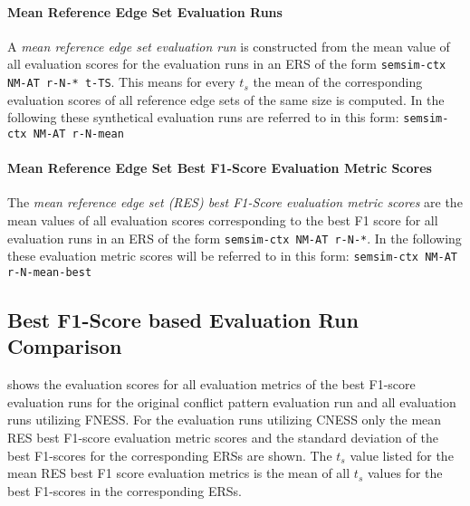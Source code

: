 \documentclass[11pt]{scrreprt}
\begin{document}
\paragraph{Mean Reference Edge Set Evaluation Runs}
A \textit{mean reference edge set evaluation run} is constructed from the mean value of all evaluation scores for the evaluation runs in an ERS of the form \texttt{semsim-ctx NM-AT r-N-* t-TS}. This means for every \(t_s\) the mean of the corresponding evaluation scores of all reference edge sets of the same size is computed. In the following these synthetical evaluation runs are referred to in this form: \texttt{semsim-ctx NM-AT r-N-mean}

\paragraph{Mean Reference Edge Set Best F1-Score Evaluation Metric Scores}
The \textit{mean reference edge set (RES) best F1-Score evaluation metric scores} are the mean values of all evaluation scores corresponding to the best F1 score for all evaluation runs in an ERS of the form \texttt{semsim-ctx NM-AT r-N-*}. In the following these evaluation metric scores will be referred to in this form: \texttt{semsim-ctx NM-AT r-N-mean-best}



\subsection{Best F1-Score based Evaluation Run Comparison}
\label{sec:best-f1-score-eval-run-comparison}
 shows the evaluation scores for all evaluation metrics of the best F1-score evaluation runs for the original conflict pattern evaluation run and all evaluation runs utilizing FNESS. For the evaluation runs utilizing CNESS only the mean RES best F1-score evaluation metric scores and the standard deviation of the best F1-scores for the corresponding ERSs are shown. The \(t_s\) value listed for the mean RES best F1 score evaluation metrics is the mean of all \(t_s\) values for the best F1-scores in the corresponding ERSs.
\end{document}
